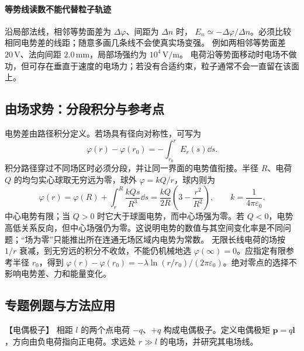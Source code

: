 \paragraph{等势线读数不能代替粒子轨迹}
沿局部法线，相邻等势面差为 $\Delta\varphi$、间距为 $\Delta n$ 时，
$E_n\simeq-\Delta\varphi/\Delta n$。必须比较相同电势差的线距；随意多画几条线不会使真实场变强。
例如两相邻等势面差 $20\,\mathrm V$、法向间距 $2.0\,\mathrm{mm}$，局部场强约为 $10^4\,\mathrm{V/m}$。
电荷沿等势面移动时电场不做功，但可存在垂直于速度的电场力；若没有合适约束，粒子通常不会一直留在该面上。


\subsection{由场求势：分段积分与参考点}
电势差由路径积分定义。若场具有径向对称性，可写为
\[
 \varphi(r)-\varphi(r_0)=-\int_{r_0}^{r}E_r(s)\dd s.
\]
积分路径穿过不同场区时必须分段，并让同一界面的电势值衔接。半径 $R$、电荷 $Q$ 的均匀实心球取无穷远为零，球外 $\varphi=kQ/r$，球内则为
\[
 \varphi(r)=\varphi(R)+\int_r^R\frac{kQs}{R^3}\dd s
 =\frac{kQ}{2R}\left(3-\frac{r^2}{R^2}\right),\qquad k=\frac1{4\pi\varepsilon_0}.
\]
中心电势有限；当 $Q>0$ 时它大于球面电势，而中心场强为零。若 $Q<0$，电势高低关系反向，但中心场强仍为零。这说明电势的数值与其空间变化率是不同问题；“场为零”只能推出所在连通无场区域内电势为常数。
无限长线电荷的场按 $1/r$ 衰减，到无穷远的积分不收敛，不能仍机械地选 $\varphi(\infty)=0$。应指定有限参考半径 $r_0$，得到
$\varphi(r)-\varphi(r_0)=-\lambda\ln(r/r_0)/(2\pi\varepsilon_0)$。绝对零点的选择不影响电势差、力和能量变化。


\subsection{专题例题与方法应用}

\begin{origexamplebox}{【电偶极子】}\label{ch19:ex:s32-1-4}
相距 $l$ 的两个点电荷 $-q$、$+q$ 构成电偶极子。定义电偶极矩
$\boldsymbol p=q\boldsymbol l$，方向由负电荷指向正电荷。求远处 $r\gg l$ 的电场，并研究其电场线。
\begin{center}\end{center}
\label{ch19:fig:em-source-thirty-second-section-4}
\end{origexamplebox}\par\nopagebreak[4]

